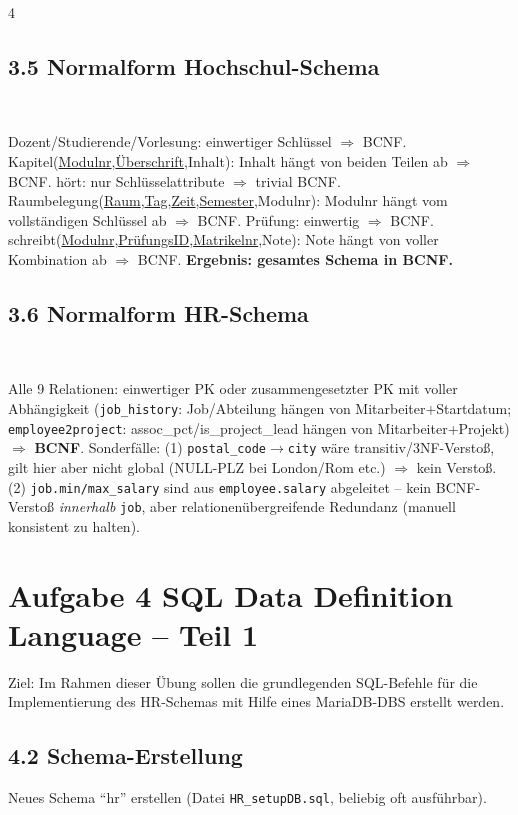\documentclass[8pt,a4paper]{extarticle}
\newcommand{\Kopf}[1]{}
\newenvironment{loesung}[1][]{%
    \par\noindent{\bfseries\color{loesungrahmen}\small$\blacktriangleright$~L\"osung#1:}~%
}{\par\smallskip}
\newcommand{\pk}[1]{\underline{#1}}
\begin{document}
\begin{multicols}{4}
\subsection*{3.5 \quad Normalform Hochschul-Schema}
\begin{loesung}
Dozent/Studierende/Vorlesung: einwertiger Schl\"ussel $\Rightarrow$ BCNF. Kapitel(\pk{Modulnr},\pk{\"Uberschrift},Inhalt): Inhalt h\"angt von beiden Teilen ab $\Rightarrow$ BCNF. h\"ort: nur Schl\"usselattribute $\Rightarrow$ trivial BCNF. Raumbelegung(\pk{Raum},\pk{Tag},\pk{Zeit},\pk{Semester},Modulnr): Modulnr h\"angt vom vollst\"andigen Schl\"ussel ab $\Rightarrow$ BCNF. Pr\"ufung: einwertig $\Rightarrow$ BCNF. schreibt(\pk{Modulnr},\pk{Pr\"ufungsID},\pk{Matrikelnr},Note): Note h\"angt von voller Kombination ab $\Rightarrow$ BCNF. \textbf{Ergebnis: gesamtes Schema in BCNF.}
\end{loesung}

\subsection*{3.6 \quad Normalform HR-Schema}
\begin{loesung}
Alle 9 Relationen: einwertiger PK oder zusammengesetzter PK mit voller Abh\"angigkeit (\texttt{job\_history}: Job/Abteilung h\"angen von Mitarbeiter+Startdatum; \texttt{employee2project}: assoc\_pct/is\_project\_lead h\"angen von Mitarbeiter+Projekt) $\Rightarrow$ \textbf{BCNF}. Sonderf\"alle: (1) \texttt{postal\_code}$\to$\texttt{city} w\"are transitiv/3NF-Versto\ss{}, gilt hier aber nicht global (NULL-PLZ bei London/Rom etc.) $\Rightarrow$ kein Versto\ss{}. (2) \texttt{job.min/max\_salary} sind aus \texttt{employee.salary} abgeleitet -- kein BCNF-Versto\ss{} \emph{innerhalb} \texttt{job}, aber relationen\"ubergreifende Redundanz (manuell konsistent zu halten).
\end{loesung}


\section*{Aufgabe 4 \quad SQL Data Definition Language -- Teil 1}
\Kopf{Aufgabe 4 SQL Data Definition Language - Teil 1}

Ziel: Im Rahmen dieser \"Ubung sollen die grundlegenden SQL-Befehle f\"ur die Implementierung des HR-Schemas mit Hilfe eines MariaDB-DBS erstellt werden.

\subsection*{4.2 \quad Schema-Erstellung}
Neues Schema ``hr'' erstellen (Datei \texttt{HR\_setupDB.sql}, beliebig oft ausf\"uhrbar).


\end{multicols}
\end{document}
